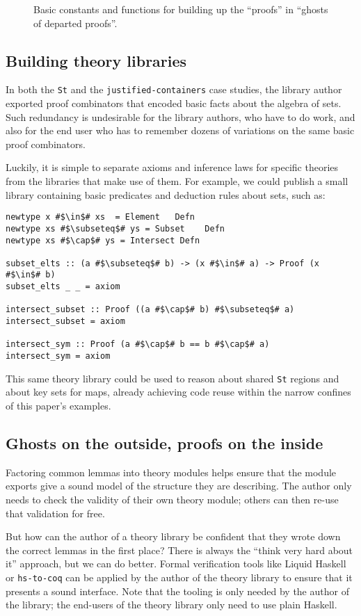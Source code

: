 \documentclass[format=sigplan, review=false, screen=true]{acmart}
\begin{document}
\begin{figure}
  \inputminted{haskell}{pred.hs}
  \caption{Basic constants and functions for building up the ``proofs''
    in ``ghosts of departed proofs''. 
    \label{predicate-logic}}
\end{figure}

\subsection{Building theory libraries}
In both the \texttt{St} and the \texttt{justified-containers} case studies,
the library author exported proof combinators that encoded basic facts about
the algebra of sets. Such redundancy is undesirable for the library authors,
who have to do work, and also for the end user who has to remember dozens of
variations on the same basic proof combinators.

Luckily, it is simple to separate axioms and inference laws for specific theories
from the libraries that make use of them. For example, we could publish a small
library containing basic predicates and deduction rules about sets, such as:
\begin{verbatim}
newtype x #$\in$# xs  = Element   Defn
newtype xs #$\subseteq$# ys = Subset    Defn
newtype xs #$\cap$# ys = Intersect Defn

subset_elts :: (a #$\subseteq$# b) -> (x #$\in$# a) -> Proof (x #$\in$# b)
subset_elts _ _ = axiom

intersect_subset :: Proof ((a #$\cap$# b) #$\subseteq$# a)
intersect_subset = axiom

intersect_sym :: Proof (a #$\cap$# b == b #$\cap$# a)
intersect_sym = axiom
\end{verbatim}
This same theory library could be used to reason about shared \texttt{St}
regions and about key sets for maps, already achieving code reuse within
the narrow confines of this paper's examples.

\subsection{Ghosts on the outside, proofs on the inside}
Factoring common lemmas into theory modules helps ensure that
the module exports give a sound model of the structure they are
describing. The author only needs to check the validity of their own
theory module; others can then re-use that validation for free.

But how can the author of a theory library be confident that they wrote down
the correct lemmas in the first place? There is always the ``think very hard
about it'' approach, but we can do better. Formal verification tools like
Liquid Haskell \cite{vazou2016liquid} or \texttt{hs-to-coq} \cite{spector2018total}
can be applied by the author of the theory library to ensure that it presents a
sound interface. Note that the tooling is only needed by the author of the library;
the end-users of the theory library only need to use plain Haskell.
\end{document}
